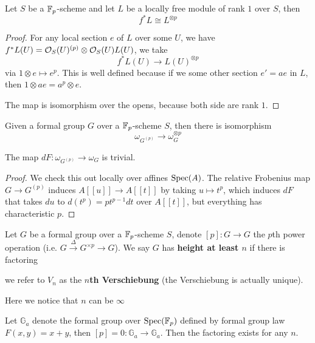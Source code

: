 \begin{lemma}
    Let $S$ be a $\mathbb{F}_p$-scheme and let $L$ be a locally free module of rank $1$ over $S$, then 
    \[
        f^*L\cong L^{\otimes p}
    \]
\end{lemma}
\begin{proof}
    For any local section $e$ of $L$ over some $U$, we have $f^*L(U)=\mathcal{O}_S(U)^{(p)}\otimes \mathcal{O}_S(U) L(U)$, we take 
    \[
    f^*L(U)\to L(U)^{\otimes p}
    \]via $1\otimes e\mapsto e^p$. This is well defined because if we some other section $e'=ae$ in $L$, then $1\otimes ae=a^p\otimes e$.

    The map is isomorphism over the opens, because both side are rank $1$.
\end{proof}
Given a formal group $G$ over a $\mathbb{F}_p$-scheme $S$, then there is isomorphism
\[
\omega_{G^{(p)}}\to \omega_{G}^{\otimes p}
\]

\begin{lemma}
    The map $dF: \omega_{G^{(p)}}\to \omega_{G}$ is trivial.
\end{lemma}
\begin{proof}
    We check this out locally over affines $\operatorname{\mathrm{Spec}}(A)$. The relative Frobenius map $G\to G^{(p)}$ induces $A[[u]]\to A[[t]]$ by taking $u\mapsto t^p$, which induces $dF$ that takes $du$ to $d(t^p)=pt^{p-1}dt$ over $A[[t]]$, but everything has characteristic $p$.
\end{proof}

\begin{definition}
    Let $G$ be a formal group over a $\mathbb{F}_p$-scheme $S$, denote $[p]:G\to G$ the $p$th power operation (i.e. $G\xrightarrow{\Delta} G^{\times p}\to G$). We say $G$ has \textbf{height at least $n$} if there is factoring
    \begin{center}
    \end{center}we refer to $V_n$ as the \textbf{$n$th Verschiebung} (the Verschiebung is actually unique).
\end{definition}

Here we notice that $n$ can be $\infty$
\begin{remark}
    Let $\mathbb{G}_a$ denote the formal group over $\operatorname{\mathrm{Spec}}(\mathbb{F}_p)$ defined by formal group law $F(x,y)=x+y$, then $[p]=0 :\mathbb{G}_a\to \mathbb{G}_a$. Then the factoring exists for any $n$.
\end{remark}

